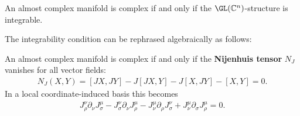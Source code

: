 
    \begin{property}
        An almost complex manifold is complex if and only if the $\GL(\mathbb{C}^n)$-structure is integrable.
    \end{property}
    The integrability condition can be rephrased algebraically as follows:
    \begin{theorem}
        An almost complex manifold is complex if and only if the \textbf{Nijenhuis tensor} $N_J$ vanishes for all vector fields:
        \begin{gather}
            \label{complex:integrable_structure}
            N_J(X,Y) = [JX,JY] - J[JX,Y] - J[X,JY] - [X,Y] = 0.
        \end{gather}
        In a local coordinate-induced basis this becomes
        \begin{gather}
            J_\rho^\nu\partial_\nu J_\sigma^\mu - J_\sigma^\nu\partial_\nu J_\rho^\mu - J_\nu^\mu\partial_\rho J_\sigma^\nu + J_\nu^\mu\partial_\sigma J_\rho^\mu = 0.
        \end{gather}
    \end{theorem}

